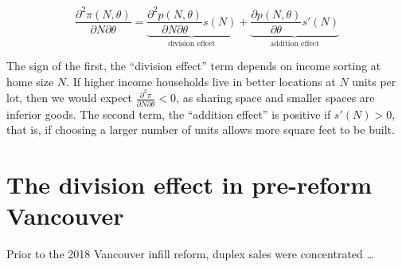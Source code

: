 \documentclass[12pt]{article}
\begin{document}
\begin{equation}
	\frac{\partial^{2} \pi(N,\theta)}{\partial N \partial \theta} = \underbrace{\frac{\partial^{2} p(N,\theta)}{\partial N \partial \theta}s(N)}_{\text{division effect}} + \underbrace{\frac{\partial p(N,\theta)}{\partial \theta}s'(N)}_{\text{addition effect}}
\end{equation}

The sign of the first, the ``division effect'' term depends on income sorting at home size $N$. If higher income households live in better locations at $N$ units per lot, then we would expect $\frac{\partial^{2}\pi}{\partial N\partial \theta}<0$, as sharing space and smaller spaces are inferior goods. The second term, the ``addition effect'' is positive if $s'(N)>0$, that is, if choosing a larger number of units allows more square feet to be built. 

\section{The division effect in pre-reform Vancouver}
Prior to the 2018 Vancouver infill reform, duplex sales were concentrated \dots
\end{document}

